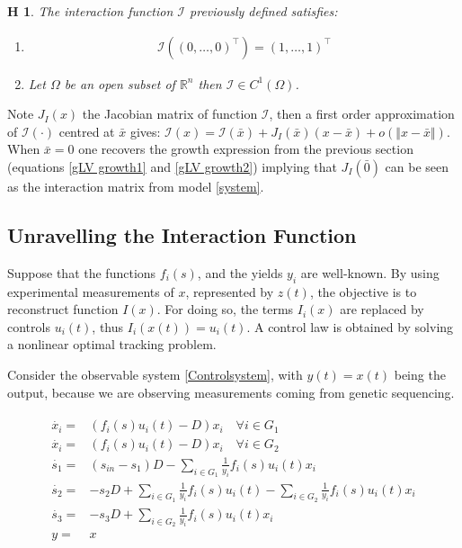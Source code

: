 \documentclass[3p,times]{article}
\newcommand{\R}{\mathbb{R}}
\newcommand{\I}{\mathcal{I}}
\newtheorem{hypo}{H}
\begin{document}
\begin{hypo}
	The interaction function $\I$ previously defined satisfies:
	\begin{enumerate}
		\item\begin{align}
		\I \left( (0,\dots,0)^\top \right) = 
		(1,\dots,1)^\top 
		\end{align}
		\item Let $\Omega$ be an open subset of $ \R^n $ then $\I \in C^1(\Omega)$.
	\end{enumerate} 
\end{hypo}


Note $J_I(x)$ the Jacobian matrix of function $\mathcal{I}$, then a first order approximation of $\I(\cdot)$ centred at $\bar{x}$ gives: $\I(x) = \I(\bar{x}) + J_I(\bar{x})(x-\bar{x}) + o(\Vert x- \bar{x} \Vert)$. When $\bar{x}= 0$ one recovers the growth expression from the previous section (equations \eqref{gLV growth1} and \eqref{gLV growth2}) implying that $J_I(\bar{0})$ can be seen as the interaction matrix from model \eqref{system}.

\subsection{Unravelling the Interaction Function}

Suppose that the functions $f_i(s)$, and the yields $y_i$ are well-known. By using experimental measurements of $x$, represented by $z(t)$, the objective is to reconstruct function $I(x)$. For doing so, the terms $I_i(x)$ are replaced by controls $u_i(t)$, thus $I_i(x(t)) = u_i(t)$. A control law is obtained by solving a nonlinear optimal tracking problem.	

Consider the observable system \eqref{Controlsystem}, with $y(t) = x(t)$ being the output, because we are observing measurements coming from genetic sequencing.

\begin{align} 
\label{Controlsystem}
\begin{array}{cl}
\dot{x_i} =& \left(f_i(s)u_i(t) -D \right)x_i \quad \forall i \in G_1\\
\dot{x_i} =& \left(f_i(s)u_i(t) -D \right)x_i \quad \forall i \in G_2\\
\dot{s_1} =& \displaystyle (s_{in}-s_1)D-\sum\limits_{i \in G_1}\frac{1}{y_i}f_i(s)u_i(t) x_i  \\
\dot{s_2} = & \displaystyle -s_2D+\sum\limits_{i \in G_1}\frac{1}{y_i}f_i(s)u_i(t)	-\sum\limits_{i \in G_2}\frac{1}{y_i}f_i(s)u_i(t) x_i  \\
\dot{s_3} =&  \displaystyle -s_3D+\sum\limits_{i \in G_2}\frac{1}{y_i}f_i(s)u_i(t) x_i \\
y  =& x
\end{array}
\end{align}	
\end{document}
